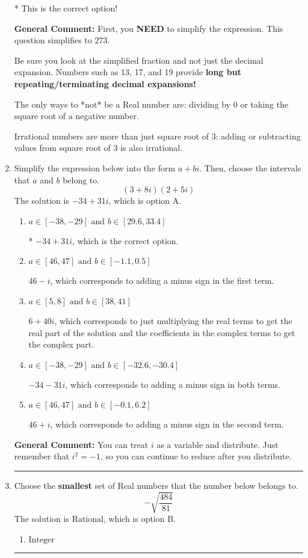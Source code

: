 \documentclass{extbook}[14pt]
\newcommand{\litem}[1]{\item #1

\rule{\textwidth}{0.4pt}}
\begin{document}
\begin{enumerate}
{\begin{enumerate}[label=\Alph*.]
* This is the correct option!
\end{enumerate}

\textbf{General Comment:} First, you \textbf{NEED} to simplify the expression. This question simplifies to $273$. 
 
 Be sure you look at the simplified fraction and not just the decimal expansion. Numbers such as 13, 17, and 19 provide \textbf{long but repeating/terminating decimal expansions!} 
 
 The only ways to *not* be a Real number are: dividing by 0 or taking the square root of a negative number. 
 
 Irrational numbers are more than just square root of 3: adding or subtracting values from square root of 3 is also irrational.
}
\litem{
Simplify the expression below into the form $a+bi$. Then, choose the intervals that $a$ and $b$ belong to.
\[ (3 + 8 i)(2 + 5 i) \]
The solution is \( -34 + 31 i \), which is option A.\begin{enumerate}[label=\Alph*.]
\item \( a \in [-38, -29] \text{ and } b \in [29.6, 33.4] \)

* $-34 + 31 i$, which is the correct option.
\item \( a \in [46, 47] \text{ and } b \in [-1.1, 0.5] \)

 $46 - i$, which corresponds to adding a minus sign in the first term.
\item \( a \in [5, 8] \text{ and } b \in [38, 41] \)

 $6 + 40 i$, which corresponds to just multiplying the real terms to get the real part of the solution and the coefficients in the complex terms to get the complex part.
\item \( a \in [-38, -29] \text{ and } b \in [-32.6, -30.4] \)

 $-34 - 31 i$, which corresponds to adding a minus sign in both terms.
\item \( a \in [46, 47] \text{ and } b \in [-0.1, 6.2] \)

 $46 + i$, which corresponds to adding a minus sign in the second term.
\end{enumerate}

\textbf{General Comment:} You can treat $i$ as a variable and distribute. Just remember that $i^2=-1$, so you can continue to reduce after you distribute.
}
\litem{
Choose the \textbf{smallest} set of Real numbers that the number below belongs to.
\[ -\sqrt{\frac{484}{81}} \]
The solution is \( \text{Rational} \), which is option B.\begin{enumerate}[label=\Alph*.]
\item \( \text{Integer} \)


\end{enumerate}}
\end{enumerate}
\end{document}
